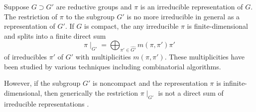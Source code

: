 \documentclass[reqno,12pt]{pja00} %
\newcommand{\Hom}{\mbox{\normalfont Hom}}
\theoremstyle{definition}
\theoremstyle{exampstyle} \newtheorem{examp}[theorem]{Theorem}
\begin{document}
Suppose $G \supset G'$ are reductive groups and $\pi$ is an irreducible
representation of $G$. 
The restriction of $\pi$ to the subgroup $G'$ is no more irreducible in general as a representation
of $G'$. If $G$ is compact, the any irreducible $\pi$ is finite-dimensional and splits
into a finite direct sum
\[ \pi\!\mid_{G'} = \bigoplus_{\pi' \in \widehat{G'}} m (\pi, \pi') \pi' \]
of irreducibles $\pi'$ of $G'$ with multiplicities $m(\pi,\pi')$. These multiplicities have been studied
by various techniques including combinatorial algorithms.

However, if the subgroup $G'$ is noncompact and the representation $\pi$ is infinite-dimensional, then generically the restriction $\pi\!\mid_{G'}$
is not a direct sum of irreducible representations \cite{kobayashi1998discrete3}.
\end{document}

